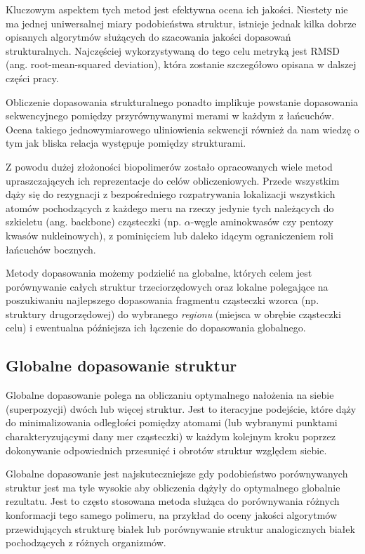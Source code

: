 \documentclass[licencjacka]{pracamgr}
\begin{document}
Kluczowym aspektem tych metod jest efektywna ocena ich jakości. Niestety nie ma jednej uniwersalnej miary podobieństwa struktur,  istnieje jednak kilka dobrze opisanych algorytmów służących do szacowania jakości dopasowań strukturalnych. Najczęściej wykorzystywaną do tego celu metryką jest RMSD (ang. root-mean-squared deviation), która zostanie szczegółowo opisana w dalszej części pracy.

Obliczenie dopasowania strukturalnego ponadto implikuje powstanie dopasowania sekwencyjnego pomiędzy przyrównywanymi merami w każdym z łańcuchów. Ocena takiego jednowymiarowego uliniowienia sekwencji również da nam wiedzę o tym jak bliska relacja występuje pomiędzy strukturami.

Z powodu dużej złożoności biopolimerów zostało opracowanych wiele metod upraszczających ich reprezentacje do celów obliczeniowych. Przede wszystkim dąży się do rezygnacji z bezpośredniego rozpatrywania lokalizacji wszystkich atomów pochodzących z każdego meru na rzeczy jedynie tych należących do szkieletu (ang. backbone) cząsteczki (np. $\alpha$-węgle aminokwasów czy pentozy kwasów nukleinowych), z pominięciem lub daleko idącym ograniczeniem roli łańcuchów bocznych.

Metody dopasowania możemy podzielić na globalne, których celem jest porównywanie całych struktur trzeciorzędowych oraz lokalne polegające na poszukiwaniu najlepszego dopasowania fragmentu cząsteczki wzorca (np. struktury drugorzędowej) do wybranego \textit{regionu} (miejsca w obrębie cząsteczki celu) i ewentualna późniejsza ich łączenie do dopasowania globalnego.

\subsection{Globalne dopasowanie struktur} 

Globalne dopasowanie polega na obliczaniu optymalnego nałożenia na siebie (superpozycji) dwóch lub więcej struktur. Jest to iteracyjne podejście, które dąży do minimalizowania odległości pomiędzy atomami (lub wybranymi punktami charakteryzującymi dany mer cząsteczki) w każdym kolejnym kroku poprzez dokonywanie odpowiednich przesunięć i obrotów struktur względem siebie. 

Globalne dopasowanie jest najskuteczniejsze gdy podobieństwo porównywanych struktur jest ma tyle wysokie aby obliczenia dążyły do optymalnego globalnie rezultatu. Jest to często stosowana metoda służąca do porównywania różnych konformacji tego samego polimeru, na przykład do oceny jakości algorytmów przewidujących strukturę białek lub porównywanie struktur analogicznych białek pochodzących z różnych organizmów. 
\end{document}
